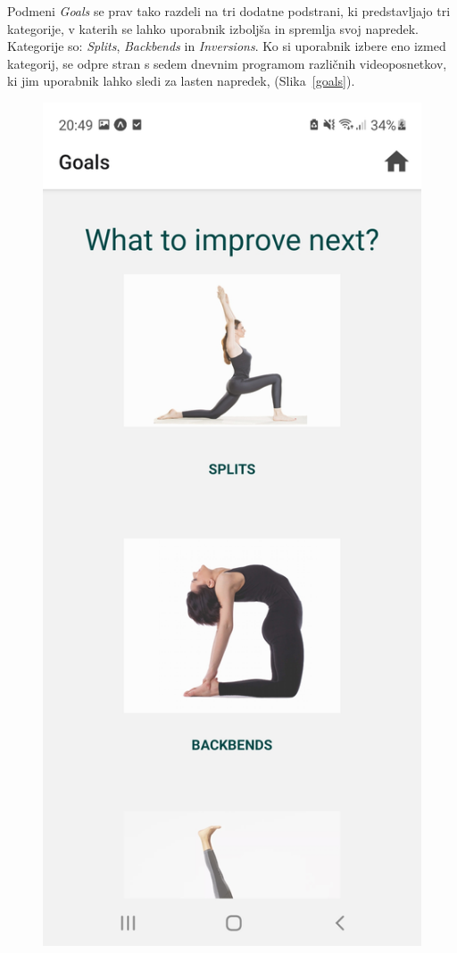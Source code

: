 \documentclass[a4paper, 12pt]{book}
\begin{document}
Podmeni \textit{Goals} se prav tako razdeli na tri dodatne podstrani, ki predstavljajo tri kategorije, v katerih se lahko uporabnik izboljša in spremlja svoj napredek. Kategorije so: \textit{Splits}, \textit{Backbends} in \textit{Inversions}. Ko si uporabnik izbere eno izmed kategorij, se odpre stran s sedem dnevnim programom različnih videoposnetkov, ki jim uporabnik lahko sledi za lasten napredek, (Slika~\ref{goals}).

\begin{figure}[ht]
\centering
  \begin{minipage}[b]{0.49\textwidth}
    \includegraphics[width=\textwidth]{goals.jpg}\centering

\end{minipage}
\end{figure}
\end{document}
